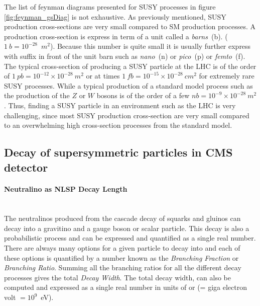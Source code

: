 {The list of feynman diagrams presented for SUSY processes in figure \ref{fig:feynman_gsDiag} is not exhaustive. As previously mentioned, SUSY production cross-sections are very small compared to SM production processes. A production cross-section is express in term of a unit called a \textit{barns}~(b). ($1~b = 10^{-28}$~$m^{2}$). Because this number is quite small it is usually further express with suffix in front of the unit barn such as \textit{nano}~(n) or \textit{pico}~(p) or \textit{femto}~(f). The typical cross-section of producing a SUSY particle at the LHC is of the order of $1~pb =10^{-12}\times 10^{-28}~m^{2}$ or at times $1~fb = 10^{-15}\times 10^{-28}~cm^{2}$ for extremely rare SUSY processes. While a typical production of a standard model process such as the production of the $Z$ or $W$ bosons is of the order of a few $nb = 10^{-9}\times 10^{-28}~m^{2}$. Thus, finding a SUSY particle in an environment such as the LHC is very challenging, since most SUSY production cross-section are very small compared to an overwhelming high cross-section processes from the standard model.


\subsection{Decay of supersymmetric particles in CMS detector}
\paragraph{Neutralino as NLSP Decay Length}\mbox{}\\
The neutralinos produced from the cascade decay of squarks and gluinos can decay into a gravitino and a gauge boson or scalar particle. This decay is also a probabilistic process and can be expressed and quantified as a single real number. 
 There are always many options for a given particle to decay into and each of these options is quantified by a number known as the \textit{Branching  Fraction} or \textit{Branching Ratio}. Summing all the branching ratios for all the different decay processes gives the total \textit{Decay Width}. The total decay width, can also be computed and expressed as a single real number in units of \GeV or \MeV (\GeV = giga electron volt $=10^{9}$~eV). 
}
